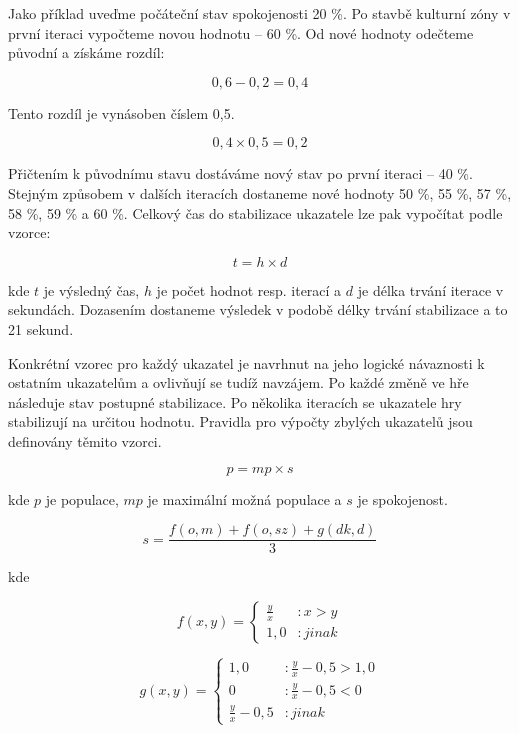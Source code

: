 \documentclass[twoside,12pt]{article}
\begin{document}
 Jako příklad uveďme počáteční stav spokojenosti 20 \%. Po stavbě kulturní zóny v první iteraci vypočteme novou hodnotu -- 60 \%.  Od nové hodnoty odečteme původní a získáme rozdíl: 
 
 $$ 0,6 - 0,2 = 0,4 $$
 
 Tento rozdíl je vynásoben číslem 0,5.
 
 $$ 0,4 \times 0,5 =  0,2 $$
 
 Přičtením k původnímu stavu dostáváme nový stav po první iteraci -- 40 \%. Stejným způsobem v dalších iteracích dostaneme nové hodnoty 50 \%, 55 \%, 57 \%, 58 \%, 59 \% a 60 \%. Celkový čas do stabilizace ukazatele lze pak vypočítat podle vzorce:
 
 \begin{equation}
t = h \times d
\end{equation}
 
 kde $t$ je výsledný čas, $h$ je počet hodnot resp. iterací a $d$ je délka trvání iterace v sekundách.
Dozasením dostaneme výsledek v podobě délky trvání stabilizace a to 21 sekund.
 
 Konkrétní vzorec pro každý ukazatel je navrhnut na jeho logické návaznosti k ostatním ukazatelům a ovlivňují se tudíž navzájem. Po každé změně ve hře následuje stav postupné stabilizace. Po několika iteracích se ukazatele hry stabilizují na určitou hodnotu. Pravidla pro výpočty zbylých ukazatelů jsou definovány těmito vzorci.
 
 
 \begin{equation}
p = mp \times s
\end{equation}
 
 kde $p$ je populace, $mp$ je maximální možná populace a $s$ je spokojenost.
 

\begin{equation}
s = \frac{f(o,m) + f(o, sz) + g(dk, d)}{3}
\end{equation}

kde

\begin{equation}
f(x, y) = \left\{
  \begin{array}{lr}
     \frac{y}{x} & : x > y\\
    1,0 & : jinak
  \end{array}
\right.
\end{equation}

\begin{equation}
g(x, y) = \left\{
  \begin{array}{lr}
     1,0 & : \frac{y}{x} - 0,5 > 1,0\\
     0 & : \frac{y}{x} - 0,5 < 0\\
    \frac{y}{x} - 0,5 & : jinak
  \end{array}
\right.
\end{equation}
\end{document}
